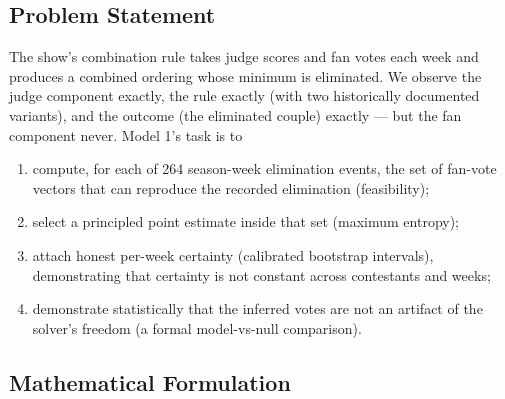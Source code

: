 \documentclass[11pt]{article}
\begin{document}
\subsection{Problem Statement}

The show's combination rule takes judge scores and fan votes each week and produces a
combined ordering whose minimum is eliminated. We observe the judge component exactly,
the rule exactly (with two historically documented variants), and the outcome (the
eliminated couple) exactly --- but the fan component never. Model 1's task is to
\begin{enumerate}[itemsep=2pt]
  \item compute, for each of 264 season-week elimination events, the set of fan-vote
        vectors that can reproduce the recorded elimination (feasibility);
  \item select a principled point estimate inside that set (maximum entropy);
  \item attach honest per-week certainty (calibrated bootstrap intervals), demonstrating
        that certainty is not constant across contestants and weeks;
  \item demonstrate statistically that the inferred votes are not an artifact of the
        solver's freedom (a formal model-vs-null comparison).
\end{enumerate}

\subsection{Mathematical Formulation}
\end{document}
